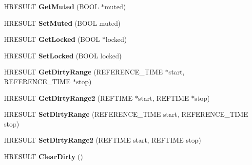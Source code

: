 \begin{DoxyCompactItemize}
H\+R\+E\+S\+U\+LT {\bfseries Get\+Muted} (B\+O\+OL $\ast$muted)
\item 
\mbox{\label{interface_i_a_m_timeline_obj_a90733cc0dd3610f26bafe77814ab285d}} 
H\+R\+E\+S\+U\+LT {\bfseries Set\+Muted} (B\+O\+OL muted)
\item 
\mbox{\label{interface_i_a_m_timeline_obj_af85028578d7a659121dc30c90743ebee}} 
H\+R\+E\+S\+U\+LT {\bfseries Get\+Locked} (B\+O\+OL $\ast$locked)
\item 
\mbox{\label{interface_i_a_m_timeline_obj_ad032308ca2c14c18f97df7ebe59ee30f}} 
H\+R\+E\+S\+U\+LT {\bfseries Set\+Locked} (B\+O\+OL locked)
\item 
\mbox{\label{interface_i_a_m_timeline_obj_a06a45ba07ad4ce7968b305c45c748a17}} 
H\+R\+E\+S\+U\+LT {\bfseries Get\+Dirty\+Range} (R\+E\+F\+E\+R\+E\+N\+C\+E\+\_\+\+T\+I\+ME $\ast$start, R\+E\+F\+E\+R\+E\+N\+C\+E\+\_\+\+T\+I\+ME $\ast$stop)
\item 
\mbox{\label{interface_i_a_m_timeline_obj_a2d3bf3673af79b9919eb8213f1aea8db}} 
H\+R\+E\+S\+U\+LT {\bfseries Get\+Dirty\+Range2} (R\+E\+F\+T\+I\+ME $\ast$start, R\+E\+F\+T\+I\+ME $\ast$stop)
\item 
\mbox{\label{interface_i_a_m_timeline_obj_ae9e06017d8ce2771cf8978ba1171aa44}} 
H\+R\+E\+S\+U\+LT {\bfseries Set\+Dirty\+Range} (R\+E\+F\+E\+R\+E\+N\+C\+E\+\_\+\+T\+I\+ME start, R\+E\+F\+E\+R\+E\+N\+C\+E\+\_\+\+T\+I\+ME stop)
\item 
\mbox{\label{interface_i_a_m_timeline_obj_a297b419e68c379f41654e77140a8c01a}} 
H\+R\+E\+S\+U\+LT {\bfseries Set\+Dirty\+Range2} (R\+E\+F\+T\+I\+ME start, R\+E\+F\+T\+I\+ME stop)
\item 
\mbox{\label{interface_i_a_m_timeline_obj_a20308c3c5677b3ae9815a827476b94d4}} 
H\+R\+E\+S\+U\+LT {\bfseries Clear\+Dirty} ()
\item 
\mbox{\label{interface_i_a_m_timeline_obj_a2b2103268b3e2c2b4ad357a9ea5be4f5}} 

\end{DoxyCompactItemize}
